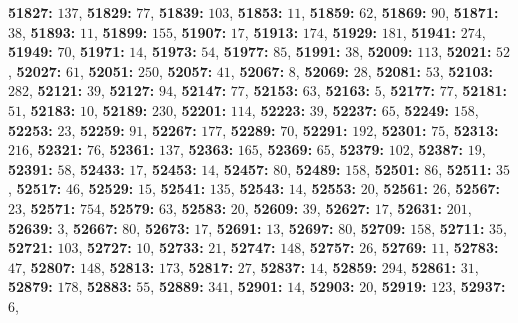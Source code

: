 \textsf{\bfseries 51827:} $137$, \textsf{\bfseries 51829:} $77$, \textsf{\bfseries 51839:} $103$, \textsf{\bfseries 51853:} $11$, \textsf{\bfseries 51859:} $62$, \textsf{\bfseries 51869:} $90$, \textsf{\bfseries 51871:} $38$, \textsf{\bfseries 51893:} $11$, \textsf{\bfseries 51899:} $155$, \textsf{\bfseries 51907:} $17$, \textsf{\bfseries 51913:} $174$, \textsf{\bfseries 51929:} $181$, \textsf{\bfseries 51941:} $274$, \textsf{\bfseries 51949:} $70$, \textsf{\bfseries 51971:} $14$, \textsf{\bfseries 51973:} $54$, \textsf{\bfseries 51977:} $85$, \textsf{\bfseries 51991:} $38$, \textsf{\bfseries 52009:} $113$, \textsf{\bfseries 52021:} $52$, \textsf{\bfseries 52027:} $61$, \textsf{\bfseries 52051:} $250$, \textsf{\bfseries 52057:} $41$, \textsf{\bfseries 52067:} $8$, \textsf{\bfseries 52069:} $28$, \textsf{\bfseries 52081:} $53$, \textsf{\bfseries 52103:} $282$, \textsf{\bfseries 52121:} $39$, \textsf{\bfseries 52127:} $94$, \textsf{\bfseries 52147:} $77$, \textsf{\bfseries 52153:} $63$, \textsf{\bfseries 52163:} $5$, \textsf{\bfseries 52177:} $77$, \textsf{\bfseries 52181:} $51$, \textsf{\bfseries 52183:} $10$, \textsf{\bfseries 52189:} $230$, \textsf{\bfseries 52201:} $114$, \textsf{\bfseries 52223:} $39$, \textsf{\bfseries 52237:} $65$, \textsf{\bfseries 52249:} $158$, \textsf{\bfseries 52253:} $23$, \textsf{\bfseries 52259:} $91$, \textsf{\bfseries 52267:} $177$, \textsf{\bfseries 52289:} $70$, \textsf{\bfseries 52291:} $192$, \textsf{\bfseries 52301:} $75$, \textsf{\bfseries 52313:} $216$, \textsf{\bfseries 52321:} $76$, \textsf{\bfseries 52361:} $137$, \textsf{\bfseries 52363:} $165$, \textsf{\bfseries 52369:} $65$, \textsf{\bfseries 52379:} $102$, \textsf{\bfseries 52387:} $19$, \textsf{\bfseries 52391:} $58$, \textsf{\bfseries 52433:} $17$, \textsf{\bfseries 52453:} $14$, \textsf{\bfseries 52457:} $80$, \textsf{\bfseries 52489:} $158$, \textsf{\bfseries 52501:} $86$, \textsf{\bfseries 52511:} $35$, \textsf{\bfseries 52517:} $46$, \textsf{\bfseries 52529:} $15$, \textsf{\bfseries 52541:} $135$, \textsf{\bfseries 52543:} $14$, \textsf{\bfseries 52553:} $20$, \textsf{\bfseries 52561:} $26$, \textsf{\bfseries 52567:} $23$, \textsf{\bfseries 52571:} $754$, \textsf{\bfseries 52579:} $63$, \textsf{\bfseries 52583:} $20$, \textsf{\bfseries 52609:} $39$, \textsf{\bfseries 52627:} $17$, \textsf{\bfseries 52631:} $201$, \textsf{\bfseries 52639:} $3$, \textsf{\bfseries 52667:} $80$, \textsf{\bfseries 52673:} $17$, \textsf{\bfseries 52691:} $13$, \textsf{\bfseries 52697:} $80$, \textsf{\bfseries 52709:} $158$, \textsf{\bfseries 52711:} $35$, \textsf{\bfseries 52721:} $103$, \textsf{\bfseries 52727:} $10$, \textsf{\bfseries 52733:} $21$, \textsf{\bfseries 52747:} $148$, \textsf{\bfseries 52757:} $26$, \textsf{\bfseries 52769:} $11$, \textsf{\bfseries 52783:} $47$, \textsf{\bfseries 52807:} $148$, \textsf{\bfseries 52813:} $173$, \textsf{\bfseries 52817:} $27$, \textsf{\bfseries 52837:} $14$, \textsf{\bfseries 52859:} $294$, \textsf{\bfseries 52861:} $31$, \textsf{\bfseries 52879:} $178$, \textsf{\bfseries 52883:} $55$, \textsf{\bfseries 52889:} $341$, \textsf{\bfseries 52901:} $14$, \textsf{\bfseries 52903:} $20$, \textsf{\bfseries 52919:} $123$, \textsf{\bfseries 52937:} $6$, 
